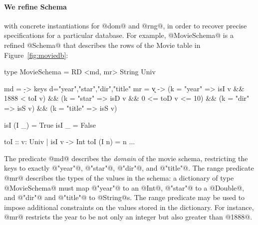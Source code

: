 \paragraph{We refine Schema} with concrete instantiations
for @dom@ and @rng@, in order to recover precise 
specifications for a particular database. For example, 
@MovieSchema@ is a refined @Schema@ that describes the 
rows of the Movie table in Figure~\ref{fig:moviedb}:
%
%
\begin{code}
type MovieSchema = RD <md, mr> String Univ

  md = \d -> 
      keys d={"year","star","dir","title"}
  mr = \k v -> 
      (k = "year"  => isI v && 1888 < toI v)
   && (k = "star"  => isD v && 0 <= toD v <= 10)
   && (k = "dir"   => isS v)
   && (k = "title" => isS v)

  isI (I _)   = True 
  isI _       = False 

  toI       :: {v: Univ | isI v} -> Int
  toI (I n) = n
...
\end{code}
%
The predicate @md@ describes the \emph{domain} of the movie schema,
restricting the keys to exactly @"year"@, @"star"@, @"dir"@, and @"title"@.
%
The range predicate @mr@ describes the types of the values in the schema:
%
a dictionary of type @MovieSchema@ must map 
@"year"@ to an @Int@,
@"star"@ to a @Double@, 
and @"dir"@ and @"title"@ to @String@s.
%
The range predicate may be used to impose additional constraints on the values
stored in the dictionary.
%
For instance, @mr@ restricts the year to be not only an integer but
also greater than @1888@.
%

